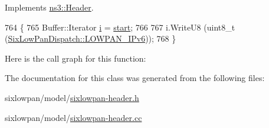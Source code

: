 Implements \hyperlink{classns3_1_1Header_afb61f1aac69ff8349a6bfe521fab5404}{ns3\+::\+Header}.


\begin{DoxyCode}
764 \{
765   Buffer::Iterator \hyperlink{bernuolliDistribution_8m_a6f6ccfcf58b31cb6412107d9d5281426}{i} = \hyperlink{namespacevisualizer_1_1core_a2a35e5d8a34af358b508dac8635754e0}{start};
766 
767   i.WriteU8 (uint8\_t (\hyperlink{classns3_1_1SixLowPanDispatch_aa51561db1ae4239db574d31d7aebbb5fa04671d540d7ccb77ec76c605193170c2}{SixLowPanDispatch::LOWPAN\_IPv6}));
768 \}
\end{DoxyCode}


Here is the call graph for this function\+:




The documentation for this class was generated from the following files\+:\begin{DoxyCompactItemize}
\item 
sixlowpan/model/\hyperlink{sixlowpan-header_8h}{sixlowpan-\/header.\+h}\item 
sixlowpan/model/\hyperlink{sixlowpan-header_8cc}{sixlowpan-\/header.\+cc}\end{DoxyCompactItemize}
